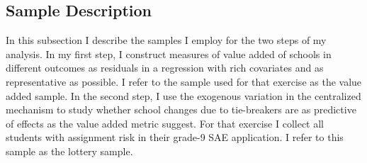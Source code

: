 \documentclass[a4paper, article, english, oneside, unknownkeysallowed, 12pt]{memoir}
\begin{document}




\subsection{Sample Description}

In this subsection I describe the samples I employ for the two steps of my analysis. 
In my first step, I construct measures of value added of schools in different outcomes as residuals in a regression with rich covariates and as representative as possible.
I refer to the sample used for that exercise as the value added sample.
In the second step, I use the exogenous variation in the centralized mechanism to study whether school changes due to tie-breakers are as predictive of effects as the value added metric suggest. 
For that exercise I collect all students with assignment risk in their grade-9 SAE application.
I refer to this sample as the lottery sample. 
\end{document}
